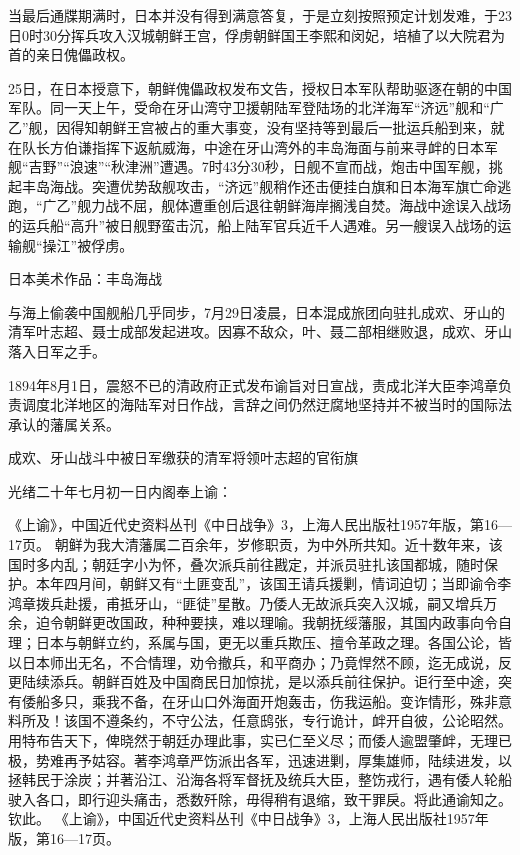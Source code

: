 \documentclass[12pt,UTF8]{ctexbook}
\begin{document}
当最后通牒期满时，日本并没有得到满意答复，于是立刻按照预定计划发难，于23日0时30分挥兵攻入汉城朝鲜王宫，俘虏朝鲜国王李熙和闵妃，培植了以大院君为首的亲日傀儡政权。

25日，在日本授意下，朝鲜傀儡政权发布文告，授权日本军队帮助驱逐在朝的中国军队。同一天上午，受命在牙山湾守卫援朝陆军登陆场的北洋海军“济远”舰和“广乙”舰，因得知朝鲜王宫被占的重大事变，没有坚持等到最后一批运兵船到来，就在队长方伯谦指挥下返航威海，中途在牙山湾外的丰岛海面与前来寻衅的日本军舰“吉野”“浪速”“秋津洲”遭遇。7时43分30秒，日舰不宣而战，炮击中国军舰，挑起丰岛海战。突遭优势敌舰攻击，“济远”舰稍作还击便挂白旗和日本海军旗亡命逃跑，“广乙”舰力战不屈，舰体遭重创后退往朝鲜海岸搁浅自焚。海战中途误入战场的运兵船“高升”被日舰野蛮击沉，船上陆军官兵近千人遇难。另一艘误入战场的运输舰“操江”被俘虏。


日本美术作品：丰岛海战

与海上偷袭中国舰船几乎同步，7月29日凌晨，日本混成旅团向驻扎成欢、牙山的清军叶志超、聂士成部发起进攻。因寡不敌众，叶、聂二部相继败退，成欢、牙山落入日军之手。

1894年8月1日，震怒不已的清政府正式发布谕旨对日宣战，责成北洋大臣李鸿章负责调度北洋地区的海陆军对日作战，言辞之间仍然迂腐地坚持并不被当时的国际法承认的藩属关系。


成欢、牙山战斗中被日军缴获的清军将领叶志超的官衔旗

光绪二十年七月初一日内阁奉上谕：

《上谕》，中国近代史资料丛刊《中日战争》3，上海人民出版社1957年版，第16—17页。
朝鲜为我大清藩属二百余年，岁修职贡，为中外所共知。近十数年来，该国时多内乱；朝廷字小为怀，叠次派兵前往戡定，并派员驻扎该国都城，随时保护。本年四月间，朝鲜又有“土匪变乱”，该国王请兵援剿，情词迫切；当即谕令李鸿章拨兵赴援，甫抵牙山，“匪徒”星散。乃倭人无故派兵突入汉城，嗣又增兵万余，迫令朝鲜更改国政，种种要挟，难以理喻。我朝抚绥藩服，其国内政事向令自理；日本与朝鲜立约，系属与国，更无以重兵欺压、擅令革政之理。各国公论，皆以日本师出无名，不合情理，劝令撤兵，和平商办；乃竟悍然不顾，迄无成说，反更陆续添兵。朝鲜百姓及中国商民日加惊扰，是以添兵前往保护。讵行至中途，突有倭船多只，乘我不备，在牙山口外海面开炮轰击，伤我运船。变诈情形，殊非意料所及！该国不遵条约，不守公法，任意鸱张，专行诡计，衅开自彼，公论昭然。用特布告天下，俾晓然于朝廷办理此事，实已仁至义尽；而倭人逾盟肇衅，无理已极，势难再予姑容。著李鸿章严饬派出各军，迅速进剿，厚集雄师，陆续进发，以拯韩民于涂炭；并著沿江、沿海各将军督抚及统兵大臣，整饬戎行，遇有倭人轮船驶入各口，即行迎头痛击，悉数歼除，毋得稍有退缩，致干罪戾。将此通谕知之。钦此。 《上谕》，中国近代史资料丛刊《中日战争》3，上海人民出版社1957年版，第16—17页。
\end{document}
